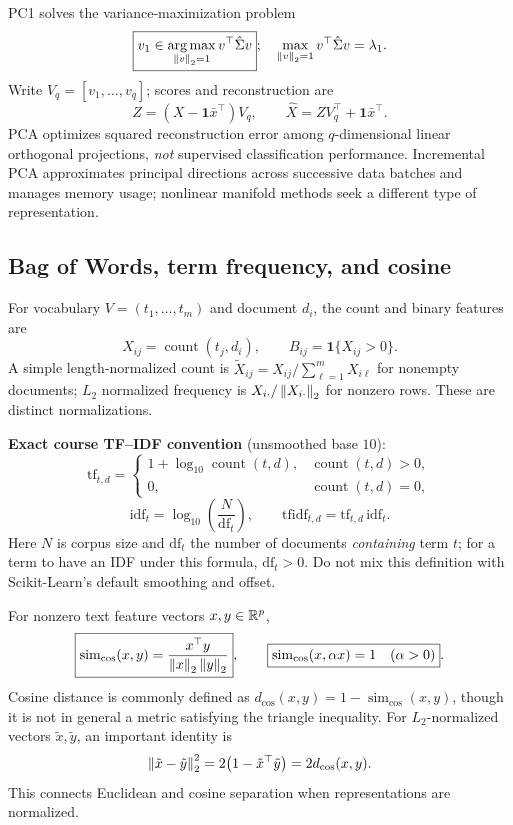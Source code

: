PC1 solves the variance-maximization problem
\[
\boxed{v_1\in\operatorname*{arg\,max}_{\left\lVert v\right\rVert_2=1}v^\top\hat\Sigma v};
\quad \max_{\left\lVert v\right\rVert_2=1}v^\top\hat\Sigma v=\lambda_1.
\]
Write $V_q=[v_1,\ldots,v_q]$; scores and reconstruction are
\[
Z=(X-\mathbf1\bar x^\top)V_q,\qquad
\boxed{\hat X=ZV_q^\top+\mathbf1\bar x^\top}.
\]
PCA optimizes squared reconstruction error among $q$-dimensional linear orthogonal projections, \emph{not} supervised classification performance. Incremental PCA approximates principal directions across successive data batches and manages memory usage; nonlinear manifold methods seek a different type of representation.

\subsection{Bag of Words, term frequency, and cosine}
For vocabulary $V=(t_1,\ldots,t_m)$ and document $d_i$, the count and binary features are
\[
\boxed{X_{ij}=\operatorname{count}(t_j,d_i)},\qquad
\boxed{B_{ij}=\mathbf1\{X_{ij}>0\}}.
\]
A simple length-normalized count is $\widetilde X_{ij}=X_{ij}/\sum_{\ell=1}^{m}X_{i\ell}$ for nonempty documents; $L_2$ normalized frequency is $X_{i\cdot}/\left\lVert X_{i\cdot}\right\rVert_2$ for nonzero rows. These are distinct normalizations.

\textbf{Exact course TF--IDF convention} (unsmoothed base $10$):
\[
\boxed{\mathrm{tf}_{t,d}=\begin{cases}1+\log_{10}\operatorname{count}(t,d),&\operatorname{count}(t,d)>0,\\0,&\operatorname{count}(t,d)=0,\end{cases}}
\]
\[
\boxed{\mathrm{idf}_{t}=\log_{10}\!\left(\frac{N}{\mathrm{df}_{t}}\right)},\qquad
\boxed{\mathrm{tfidf}_{t,d}=\mathrm{tf}_{t,d}\,\mathrm{idf}_{t}}.
\]
Here $N$ is corpus size and $\mathrm{df}_t$ the number of documents \emph{containing} term $t$; for a term to have an IDF under this formula, $\mathrm{df}_t>0$. Do not mix this definition with Scikit-Learn's default smoothing and offset.

For nonzero text feature vectors $x,y\in\mathbb R^p$,
\[
\boxed{\operatorname{sim}_{\cos}(x,y)=\frac{x^\top y}{\left\lVert x\right\rVert_2\left\lVert y\right\rVert_2}},\qquad
\boxed{\operatorname{sim}_{\cos}(x,\alpha x)=1\quad(\alpha>0)}.
\]
Cosine distance is commonly defined as $d_{\cos}(x,y)=1-\operatorname{sim}_{\cos}(x,y)$, though it is not in general a metric satisfying the triangle inequality. For $L_2$-normalized vectors $\tilde x,\tilde y$, an important identity is
\[
\left\lVert\tilde x-\tilde y\right\rVert_2^2=2\big(1-\tilde x^\top\tilde y\big)
=2d_{\cos}(x,y).
\]
This connects Euclidean and cosine separation when representations are normalized.


